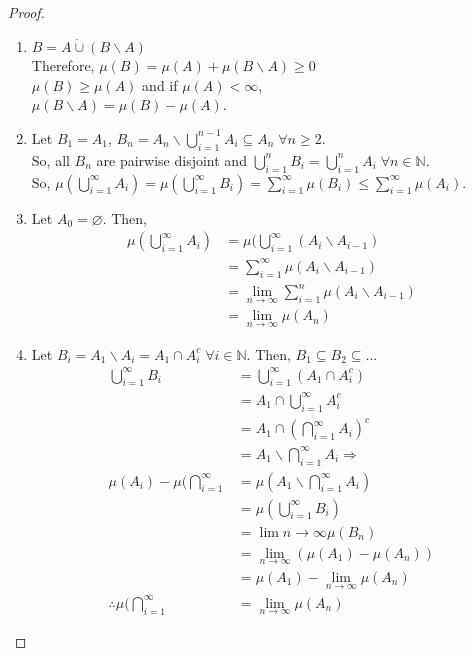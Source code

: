 \documentclass{article}
\begin{document}
\begin{myprop}{}{}
		\begin{proof}~\\
		\begin{enumerate}
			\item $B=A\dot\cup(B\backslash A)$\\
			Therefore, $\mu(B)=\mu(A)+\mu(B\backslash A)\geq0$\\
			$\mu(B)\geq\mu(A)$ and if $\mu(A)<\infty$,\\
			$\mu(B\backslash A)=\mu(B)-\mu(A)$.
			\item Let $B_1=A_1$, $B_n=A_n\backslash \bigcup_{i=1}^{n-1}A_i\subseteq A_n\;\forall n\geq2$.\\
			So, all $B_n$ are pairwise disjoint and $\bigcup_{i=1}^{n}B_i=\bigcup_{i=1}^{n}A_i\;\forall n\in\mathbb{N}$.\\
			So, $\mu(\bigcup_{i=1}^{\infty}A_i)=\mu(\bigcup_{i=1}^{\infty}B_i)=\sum_{i=1}^{\infty}\mu(B_i)\leq\sum_{i=1}^{\infty}\mu(A_i)$.
			\item Let $A_0=\varnothing$. Then,
			\begin{align*}
				\mu(\bigcup_{i=1}^{\infty}A_i)&=\mu(\bigcup_{i=1}^{\infty}(A_i\backslash A_{i-1})\\
				&=\sum_{i=1}^{\infty}\mu(A_i\backslash A_{i-1})\\
				&=\lim_{n\to\infty}\sum_{i=1}^{n}\mu(A_i\backslash A_{i-1})\\
				&=\lim_{n\to\infty}\mu(A_n)
			\end{align*}
			\item Let $B_i=A_1\backslash A_i=A_1\cap A_i^c\;\forall i\in\mathbb{N}$. Then, $B_1\subseteq B_2\subseteq...$
			\begin{align*}
				\bigcup_{i=1}^{\infty}B_i&=\bigcup_{i=1}^{\infty}(A_1\cap A_i^c)\\
				&=A_1\cap\bigcup_{i=1}^{\infty}A_i^c\\
				&=A_1\cap(\bigcap_{i=1}^{\infty}A_i)^c\\
				&=A_1\backslash\bigcap_{i=1}^{\infty}A_i\Rightarrow\\
				\mu(A_i)-\mu(\bigcap_{i=1}^{\infty}&=\mu(A_1\backslash\bigcap_{i=1}^{\infty}A_i)\\
				&=\mu(\bigcup_{i=1}^{\infty}B_i)\\
				&=\lim{n\to\infty}\mu(B_n)\\
				&=\lim_{n\to\infty}(\mu(A_1)-\mu(A_n))\\
				&=\mu(A_1)-\lim_{n\to\infty}\mu(A_n)\\
				\therefore\mu(\bigcap_{i=1}^{\infty}&=\lim_{n\to\infty}\mu(A_n)
			\end{align*}
			
		\end{enumerate}
	\end{proof}
	\end{myprop}
	
\end{document}
